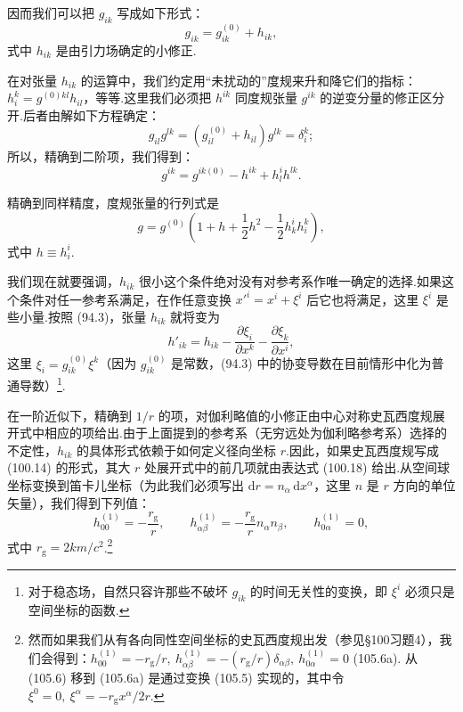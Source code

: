 因而我们可以把 $g_{ik}$ 写成如下形式：
\begin{equation}
  g_{ik}=g_{ik}^{(0)}+h_{ik},
\end{equation}
式中 $h_{ik}$ 是由引力场确定的小修正.

在对张量 $h_{ik}$ 的运算中，我们约定用“未扰动的”度规来升和降它们的指标：$h_i^k=g^{(0)kl}h_{il}$，等等.这里我们必须把 $h^{ik}$ 同度规张量 $g^{ik}$ 的逆变分量的修正区分开.后者由解如下方程确定：
\begin{equation*}
  g_{il}g^{lk}=(g_{il}^{(0)}+h_{il})g^{lk}=\delta_i^k;
\end{equation*}
所以，精确到二阶项，我们得到：
\begin{equation}
  g^{ik}=g^{ik(0)}-h^{ik}+h_l^ih^{lk}.
\end{equation}

精确到同样精度，度规张量的行列式是
\begin{equation}
  g=g^{(0)}\left(1+h+\frac{1}{2}h^{2}
  -\frac{1}{2}h_k^ih_i^k\right),
\end{equation}
式中 $h\equiv h_i^i$.

我们现在就要强调，$h_{ik}$ 很小这个条件绝对没有对参考系作唯一确定的选择.如果这个条件对任一参考系满足，在作任意变换 $x'^i=x^i+\xi^i$ 后它也将满足，这里 $\xi^i$ 是些小量.按照 (94.3)，张量 $h_{ik}$ 就将变为
\begin{equation}
  h'_{ik}=h_{ik}
  -\frac{\partial\xi_i}{\partial x^{k}}
  -\frac{\partial\xi_k}{\partial x^{i}},
\end{equation}
这里 $\xi_i=g_{ik}^{(0)}\xi^k$（因为 $g_{ik}^{(0)}$ 是常数，(94.3) 中的协变导数在目前情形中化为普通导数）\footnote{对于稳态场，自然只容许那些不破坏 $g_{ik}$ 的时间无关性的变换，即 $\xi^{i}$ 必须只是空间坐标的函数.}.

在一阶近似下，精确到 $1/r$ 的项，对伽利略值的小修正由中心对称史瓦西度规展开式中相应的项给出.由于上面提到的参考系（无穷远处为伽利略参考系）选择的不定性，$h_{ik}$ 的具体形式依赖于如何定义径向坐标 $r$.因此，如果史瓦西度规写成 (100.14) 的形式，其大 $r$ 处展开式中的前几项就由表达式 (100.18) 给出.从空间球坐标变换到笛卡儿坐标（为此我们必须写出 $\mathrm{d}r=n_{\alpha}\,\mathrm{d}x^{\alpha}$，这里 $n$ 是 $r$ 方向的单位矢量），我们得到下列值：
\begin{equation}
  h_{00}^{(1)}=-\frac{r_{\mathrm{g}}}{r},\qquad
  h_{\alpha\beta}^{(1)}=-\frac{r_{\mathrm{g}}}{r}n_{\alpha}n_{\beta},
  \qquad
  h_{0\alpha}^{(1)}=0,
\end{equation}
式中 $r_{\mathrm{g}}=2km/c^{2}$.\footnote{然而如果我们从有各向同性空间坐标的史瓦西度规出发（参见§100习题4），我们会得到：$h_{00}^{(1)}=-r_{\mathrm{g}}/r,\ h_{\alpha\beta}^{(1)}=-(r_{\mathrm{g}}/r)\delta_{\alpha\beta},\ h_{0\alpha}^{(1)}=0$ (105.6a). 从 (105.6) 移到 (105.6a) 是通过变换 (105.5) 实现的，其中令 $\xi^{0}=0,\ \xi^{\alpha}=-r_{\mathrm{g}}x^{\alpha}/2r$.}

